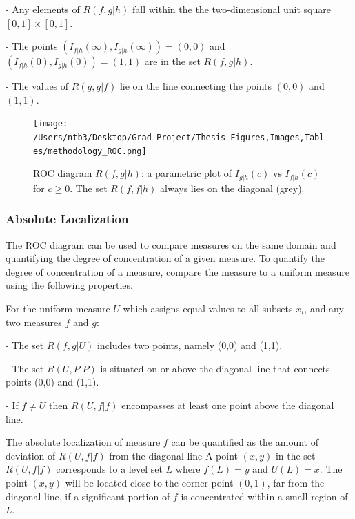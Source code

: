 \documentclass[12pt]{article} %
\theoremstyle{plain}
\begin{document}
 - Any elements of $R(f,g|h)$ fall within the the two-dimensional unit square $[0,1] \times [0,1]$.
 
 - The points $(I_{f|h}(\infty), I_{g|h}(\infty)) = (0,0)$ and $(I_{f|h}(0), I_{g|h}(0)) = (1,1)$ are in the set $R(f,g|h)$.
 
 - The values of $R(g,g|f)$ lie on the line connecting the points $(0,0)$ and $(1,1)$.
 
 
  
 \begin{figure} [!htbp]
 	\centering
 	\texttt{[image:  /Users/ntb3/Desktop/Grad\_Project/Thesis\_Figures,Images,Tables/methodology\_ROC.png]}
 	\caption{ROC diagram $R(f,g|h)$: a parametric plot of $I_{g|h}(c)$ vs $I_{f|h}(c)$ for $c \geq 0$. The set $R(f,f|h)$ always lies on the diagonal (grey).
 	}
 	\label{fig:mass_of_level_sets}
 \end{figure}
 

 
\subsubsection{Absolute Localization}
The ROC diagram can be used to compare measures on the same domain and quantifying the degree of concentration of a given measure. To quantify the degree of concentration of a measure, compare the measure to a uniform measure using the following properties.
 
For the uniform measure $U$ which assigns equal values to all subsets $x_i$, and any two measures $f$ and $g$:
 
 - The set $R(f,g|U)$ includes two points, namely (0,0) and (1,1).
 
 - The set $R(U,P|P)$ is situated on or above the diagonal line that connects points (0,0) and (1,1). 
 
 - If $f \neq U$ then $R(U,f|f)$ encompasses at least one point above the diagonal line. 
 
 The absolute localization of measure $f$ can be quantified as the amount of deviation of $R(U,f|f)$ from the diagonal line 
 A point $(x,y)$ in the set $R(U,f|f)$ corresponds to a level set $L$ where $f(L) = y$ and $U(L) = x$. The point $(x,y)$ will be located close to the corner point $(0,1)$, far from the diagonal line, if a significant portion of $f$ is concentrated within a small region of $L$. 
 
\end{document}
